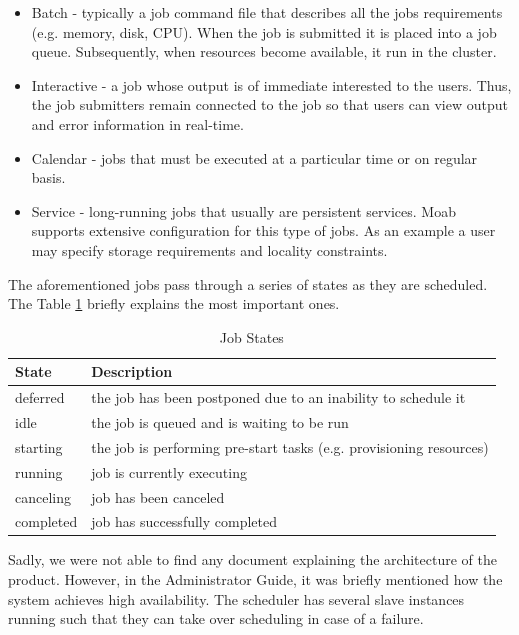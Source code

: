 \documentclass[11pt,a4paper,twoside]{report}
\begin{document}
\begin{itemize}
\item{}
Batch - typically a job command file that describes all the jobs requirements
(e.g. memory, disk, CPU). When the job is submitted it is placed into a job
queue. Subsequently, when resources become available, it run in the cluster.
\item{}
Interactive - a job whose output is of immediate interested to the users. Thus,
the job submitters remain connected to the job so that users can view output
and error information in real-time.
\item{}
Calendar - jobs that must be executed at a particular time or on regular basis.
\item{}
Service - long-running jobs that usually are persistent services. Moab supports extensive configuration for this type of jobs. As an example a user may specify storage requirements and locality constraints.
\end{itemize}


The aforementioned jobs pass through a series of states as they are scheduled.
The Table \ref{tab:Moab} briefly explains the most important ones.

\begin{table}[h]
\centering
\begin{tabular}{|l|p{10.5cm}|}
\hline
\textbf{State} & \textbf{Description} \\ \hline
deferred &  the job has been postponed due to an inability to schedule it
\\ \hline
idle & the job is queued and is waiting to be run \\ \hline
starting & the job is performing pre-start tasks (e.g. provisioning resources)
\\ \hline
running & job is currently executing \\ \hline
canceling & job has been canceled \\ \hline
completed & job has successfully completed \\ \hline
\end{tabular}
\caption{Job States}
\label{tab:Moab}
\end{table}


Sadly, we were not able to find any document explaining the architecture of the
product. However, in the Administrator Guide, it was briefly mentioned how the
system achieves high availability. The scheduler has several slave instances
running such that they can take over scheduling in case of a failure.
\end{document}
